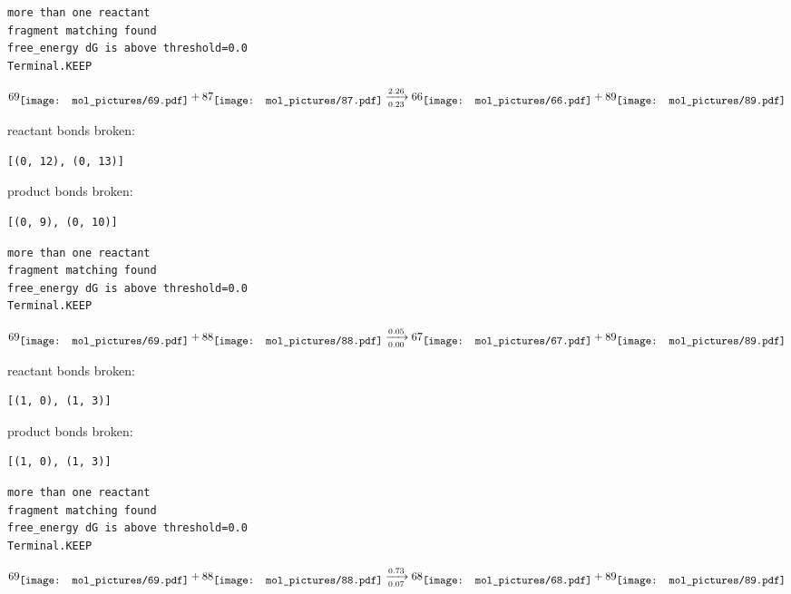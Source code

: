 \documentclass{article}
\begin{document}
\setlength\parindent{0pt}
\begin{verbatim}
more than one reactant
fragment matching found
free_energy dG is above threshold=0.0
Terminal.KEEP
\end{verbatim}
$$
69
\raisebox{-.5\height}{\texttt{[image: mol\_pictures/69.pdf]}}
+
87
\raisebox{-.5\height}{\texttt{[image: mol\_pictures/87.pdf]}}
\xrightarrow[0.23]{2.26}
66
\raisebox{-.5\height}{\texttt{[image: mol\_pictures/66.pdf]}}
+
89
\raisebox{-.5\height}{\texttt{[image: mol\_pictures/89.pdf]}}
$$


reactant bonds broken:\begin{verbatim}
[(0, 12), (0, 13)]
\end{verbatim}
product bonds broken:\begin{verbatim}
[(0, 9), (0, 10)]
\end{verbatim}




\vspace{1cm}
\begin{verbatim}
more than one reactant
fragment matching found
free_energy dG is above threshold=0.0
Terminal.KEEP
\end{verbatim}
$$
69
\raisebox{-.5\height}{\texttt{[image: mol\_pictures/69.pdf]}}
+
88
\raisebox{-.5\height}{\texttt{[image: mol\_pictures/88.pdf]}}
\xrightarrow[0.00]{0.05}
67
\raisebox{-.5\height}{\texttt{[image: mol\_pictures/67.pdf]}}
+
89
\raisebox{-.5\height}{\texttt{[image: mol\_pictures/89.pdf]}}
$$


reactant bonds broken:\begin{verbatim}
[(1, 0), (1, 3)]
\end{verbatim}
product bonds broken:\begin{verbatim}
[(1, 0), (1, 3)]
\end{verbatim}




\vspace{1cm}
\begin{verbatim}
more than one reactant
fragment matching found
free_energy dG is above threshold=0.0
Terminal.KEEP
\end{verbatim}
$$
69
\raisebox{-.5\height}{\texttt{[image: mol\_pictures/69.pdf]}}
+
88
\raisebox{-.5\height}{\texttt{[image: mol\_pictures/88.pdf]}}
\xrightarrow[0.07]{0.73}
68
\raisebox{-.5\height}{\texttt{[image: mol\_pictures/68.pdf]}}
+
89
\raisebox{-.5\height}{\texttt{[image: mol\_pictures/89.pdf]}}
$$
\end{document}
